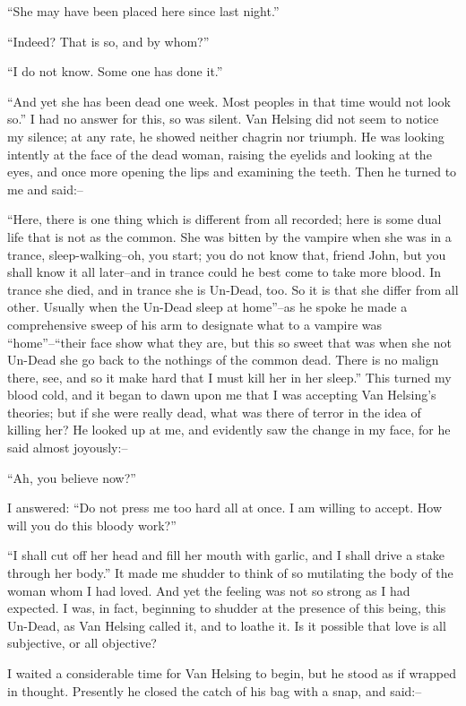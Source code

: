 \documentclass[12pt,openright]{book}
\begin{document}
“She may have been placed here since last night.”

“Indeed? That is so, and by whom?”

“I do not know. Some one has done it.”

“And yet she has been dead one week. Most peoples in that time would not look so.” I had no answer for this, so was silent. Van Helsing did not seem to notice my silence; at any rate, he showed neither chagrin nor triumph. He was looking intently at the face of the dead woman, raising the eyelids and looking at the eyes, and once more opening the lips and examining the teeth. Then he turned to me and said:–

“Here, there is one thing which is different from all recorded; here is some dual life that is not as the common. She was bitten by the vampire when she was in a trance, sleep-walking–oh, you start; you do not know that, friend John, but you shall know it all later–and in trance could he best come to take more blood. In trance she died, and in trance she is Un-Dead, too. So it is that she differ from all other. Usually when the Un-Dead sleep at home”–as he spoke he made a comprehensive sweep of his arm to designate what to a vampire was “home”–“their face show what they are, but this so sweet that was when she not Un-Dead she go back to the nothings of the common dead. There is no malign there, see, and so it make hard that I must kill her in her sleep.” This turned my blood cold, and it began to dawn upon me that I was accepting Van Helsing’s theories; but if she were really dead, what was there of terror in the idea of killing her? He looked up at me, and evidently saw the change in my face, for he said almost joyously:–

“Ah, you believe now?”

I answered: “Do not press me too hard all at once. I am willing to accept. How will you do this bloody work?”

“I shall cut off her head and fill her mouth with garlic, and I shall drive a stake through her body.” It made me shudder to think of so mutilating the body of the woman whom I had loved. And yet the feeling was not so strong as I had expected. I was, in fact, beginning to shudder at the presence of this being, this Un-Dead, as Van Helsing called it, and to loathe it. Is it possible that love is all subjective, or all objective?

I waited a considerable time for Van Helsing to begin, but he stood as if wrapped in thought. Presently he closed the catch of his bag with a snap, and said:–
\end{document}
